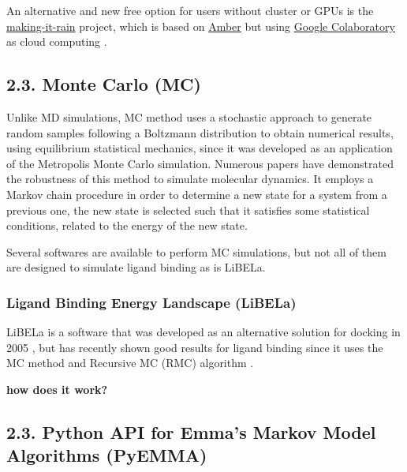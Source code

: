 \documentclass[
  journal=usp, %
  manuscript=final-report,
  year=2023,
  volume=1,
]{cup-journal}
\begin{document}

An alternative and new free option for users without cluster or GPUs is the \href{https://github.com/pablo-arantes/making-it-rain}{making-it-rain} project, which is based on \href{http://ambermd.org}{Amber} but using \href{https://colab.research.google.com/}{Google Colaboratory} as cloud computing \cite{making_it_rain}. 




\subsection{2.3. Monte Carlo (MC)}

Unlike MD simulations, MC method uses a stochastic approach to generate random samples following a Boltzmann distribution to obtain numerical results, using equilibrium statistical mechanics, since it was developed as an application of the Metropolis Monte Carlo simulation. Numerous papers have demonstrated the robustness of this method to simulate molecular dynamics. It employs a Markov chain procedure in order to determine a new state for a system from a previous one, the new state is selected such that it satisfies some statistical conditions, related to the energy of the new state.

Several softwares are available to perform MC simulations, but not all of them are designed to simulate ligand binding as is LiBELa.

\subsubsection*{\textbf{Ligand Binding Energy Landscape  (LiBELa)}}

LiBELa is a software that was developed as an alternative solution for docking in 2005 \cite{libela}, but has recently shown good results for ligand binding since it uses the MC method and Recursive MC (RMC) algorithm \cite{libela2}.

\textbf{how does it work?}



\subsection{2.3. \textbf{Python API for Emma's Markov Model Algorithms (PyEMMA)}}
\end{document}
